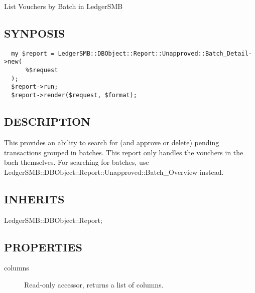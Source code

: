 \begin{description}
\begin{description}
\begin{description}
\begin{description}
\begin{description}
\begin{description}
\begin{description}
\begin{description}
\begin{description}
\begin{description}
List Vouchers by Batch 
in LedgerSMB

\subsection*{SYNPOSIS\label{LedgerSMB::DBObject::Report::Unapproved::Batch_Detail_SYNPOSIS}}
\begin{verbatim}
  my $report = LedgerSMB::DBObject::Report::Unapproved::Batch_Detail->new(
      %$request
  );
  $report->run;
  $report->render($request, $format);
\end{verbatim}
\subsection*{DESCRIPTION\label{LedgerSMB::DBObject::Report::Unapproved::Batch_Detail_DESCRIPTION}}


This provides an ability to search for (and approve or delete) pending
transactions grouped in batches.  This report only handles the vouchers in the 
bach themselves. For searching for batches, use
LedgerSMB::DBObject::Report::Unapproved::Batch\_Overview instead.

\subsection*{INHERITS\label{LedgerSMB::DBObject::Report::Unapproved::Batch_Detail_INHERITS}}
\begin{description}

\item[{LedgerSMB::DBObject::Report;}] \mbox{}\end{description}
\subsection*{PROPERTIES\label{LedgerSMB::DBObject::Report::Unapproved::Batch_Detail_PROPERTIES}}
\begin{description}

\item[{columns}] \mbox{}

Read-only accessor, returns a list of columns.

\begin{description}


\end{description}
\end{description}
\end{description}
\end{description}
\end{description}
\end{description}
\end{description}
\end{description}
\end{description}
\end{description}
\end{description}
\end{description}
